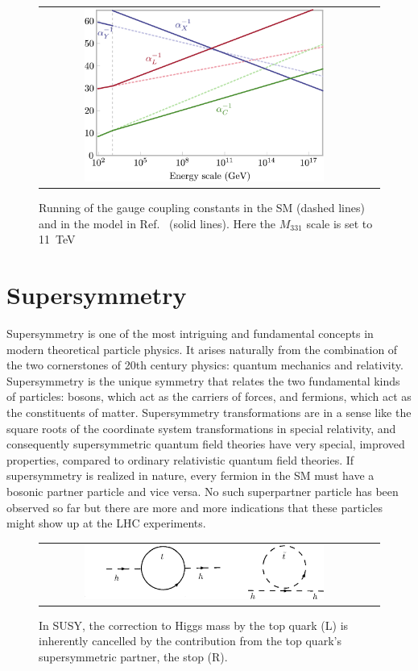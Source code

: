 \begin{figure}[tbh!]
	\centering
	\begin{tabular}{cc}
		\includegraphics[width=0.75\textwidth]{theory/pics/gauge_unification.png}
	\end{tabular}
	\caption{Running of the gauge coupling constants in the SM (dashed lines) and in the model in Ref.~\cite{PhysRevD.90.013005} (solid lines). Here the $M_{331}$ scale is set to 11~TeV}
	\label{fig:gauge_unification}
\end{figure}

\clearpage

\section{Supersymmetry}

Supersymmetry is one of the most intriguing and fundamental concepts in modern theoretical particle physics. It arises naturally from the combination of the two cornerstones of 20th century physics: quantum mechanics and relativity. Supersymmetry is the unique symmetry that relates the two fundamental kinds of particles: bosons, which act as the carriers of forces, and fermions, which act as the constituents of matter. Supersymmetry transformations are in a sense like the square roots of the coordinate system transformations in special relativity, and consequently supersymmetric quantum field theories have very special, improved properties, compared to ordinary relativistic quantum field theories. If supersymmetry is realized in nature, every fermion in the SM must have a bosonic partner particle and vice versa. No such superpartner particle has been observed so far but there are more and more indications that these particles might show up at the LHC experiments.


\begin{figure}[tbh!]
	\centering
	\begin{tabular}{cc}
		\includegraphics[width=0.75\textwidth]{theory/pics/higgs_loop.png}
	\end{tabular}
	\caption{In SUSY, the correction to Higgs mass by the top quark (L) is inherently cancelled by the contribution from the top quark's supersymmetric partner, the stop (R).}
	\label{fig:higgs_loop}
\end{figure}

